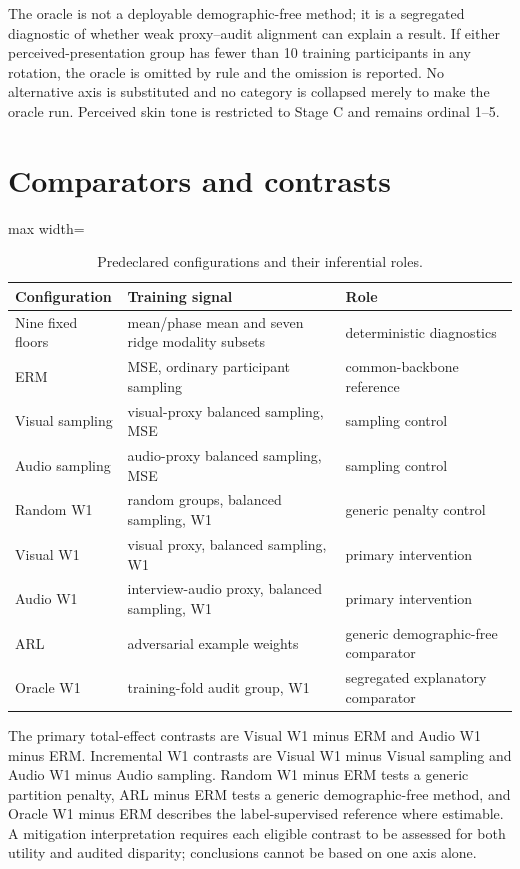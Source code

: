 The oracle is not a deployable demographic-free method; it is a segregated diagnostic of whether
weak proxy--audit alignment can explain a result. If either perceived-presentation group has fewer
than 10 training participants in any rotation, the oracle is omitted by rule and the omission is
reported. No alternative axis is substituted and no category is collapsed merely to make the
oracle run. Perceived skin tone is restricted to Stage C and remains ordinal 1--5.

\section{Comparators and contrasts}

\begin{table}[htbp]
\centering
\caption{Predeclared configurations and their inferential roles.}
\label{tab:configurations}
\begin{adjustbox}{max width=\textwidth}
\begin{tabular}{lll}
\toprule
Configuration & Training signal & Role \\
\midrule
Nine fixed floors & mean/phase mean and seven ridge modality subsets & deterministic diagnostics \\
ERM & MSE, ordinary participant sampling & common-backbone reference \\
Visual sampling & visual-proxy balanced sampling, MSE & sampling control \\
Audio sampling & audio-proxy balanced sampling, MSE & sampling control \\
Random W1 & random groups, balanced sampling, W1 & generic penalty control \\
Visual W1 & visual proxy, balanced sampling, W1 & primary intervention \\
Audio W1 & interview-audio proxy, balanced sampling, W1 & primary intervention \\
ARL & adversarial example weights & generic demographic-free comparator \\
Oracle W1 & training-fold audit group, W1 & segregated explanatory comparator \\
\bottomrule
\end{tabular}
\end{adjustbox}
\end{table}

The primary total-effect contrasts are Visual W1 minus ERM and Audio W1 minus ERM. Incremental W1
contrasts are Visual W1 minus Visual sampling and Audio W1 minus Audio sampling. Random W1 minus ERM
tests a generic partition penalty, ARL minus ERM tests a generic demographic-free method, and
Oracle W1 minus ERM describes the label-supervised reference where estimable. A mitigation
interpretation requires each eligible contrast to be assessed for both utility and audited
disparity; conclusions cannot be based on one axis alone.

